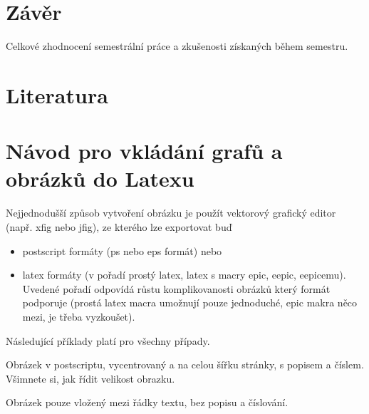 \documentclass[11pt]{article}
\begin{document}
\section{Závěr}

Celkové zhodnocení semestrální práce a zkušenosti získaných během
semestru.

\section{Literatura}

\appendix

\section{Návod pro vkládání grafů a obrázků do Latexu}

Nejjednodušší způsob vytvoření obrázku je použít vektorový grafický
editor (např. xfig nebo jfig), ze kterého lze exportovat buď
\begin{itemize}
\item postscript formáty (ps nebo eps formát) nebo
\item latex formáty (v pořadí prostý latex, latex s macry epic, eepic, eepicemu). Uvedené pořadí odpovídá růstu
komplikovanosti obrázků který formát podporuje (prostá latex macra
umožnují pouze jednoduché, epic makra něco mezi, je třeba
vyzkoušet).

\end{itemize}
Následující příklady platí pro všechny případy.

Obrázek v postscriptu, vycentrovaný a na celou šířku stránky, s
popisem a číslem. Všimnete si, jak řídit velikost obrazku.

Obrázek pouze vložený mezi řádky textu, bez popisu a číslování.\\

%
\end{document}
